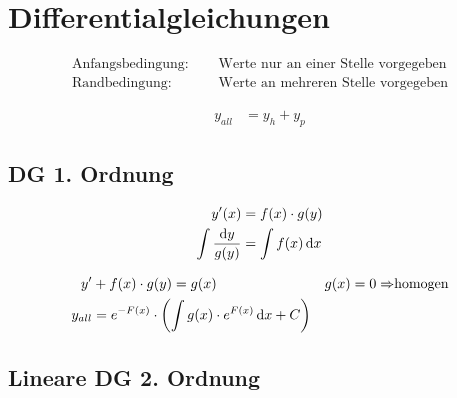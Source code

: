 \section{Differentialgleichungen}

\begin{boxshaded}
\begin{align*}
\text{Anfangsbedingung:}\quad&\text{ Werte nur an einer Stelle vorgegeben}\\
\text{Randbedingung:}\quad&\text{ Werte an mehreren Stelle vorgegeben}
\end{align*}
\end{boxshaded}

\begin{boxleft}
\end{boxleft}\begin{boxrightshaded}
\begin{align*}
y_{all}&=y_h+y_p
\end{align*}
\end{boxrightshaded}

\subsection{DG 1. Ordnung}

\begin{boxleft}
\end{boxleft}\begin{boxrightshaded}
\begin{align*}
y'(x)&=f(x)\cdot g(y)\\
\int\frac{\mathop{}\!\mathrm{d} y}{g(y)}&=\int f(x)\mathop{}\!\mathrm{d} x
\end{align*}
\end{boxrightshaded}

\begin{boxleft}
\end{boxleft}\begin{boxrightshaded}
\begin{align*}
y'&+f(x)\cdot g(y)=g(x)&&\text{$g(x)=0\Rightarrow$homogen}\\
y_{all}&=e^{-F(x)}\cdot\left(\int g(x)\cdot e^{F(x)}\mathop{}\!\mathrm{d} x+C\right)
\end{align*}
\end{boxrightshaded}

\subsection{Lineare DG 2. Ordnung}


